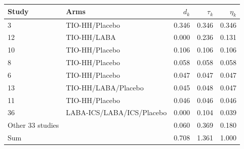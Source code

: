 \begin{tabular}{llrrr}
\toprule
Study & Arms & $d_k$ & $\tau_k$ & $\eta_k$ \\
\midrule
3 & TIO-HH/Placebo & 0.346 & 0.346 & 0.346 \\
12 & TIO-HH/LABA & 0.000 & 0.236 & 0.131 \\
10 & TIO-HH/Placebo & 0.106 & 0.106 & 0.106 \\
8 & TIO-HH/Placebo & 0.058 & 0.058 & 0.058 \\
6 & TIO-HH/Placebo & 0.047 & 0.047 & 0.047 \\
13 & TIO-HH/LABA/Placebo & 0.045 & 0.048 & 0.047 \\
11 & TIO-HH/Placebo & 0.046 & 0.046 & 0.046 \\
36 & LABA-ICS/LABA/ICS/Placebo & 0.000 & 0.104 & 0.039 \\
Other 33 studies & & 0.060 & 0.369 & 0.180 \\
\midrule
Sum & & 0.708 & 1.361 & 1.000 \\
\bottomrule
\end{tabular}
